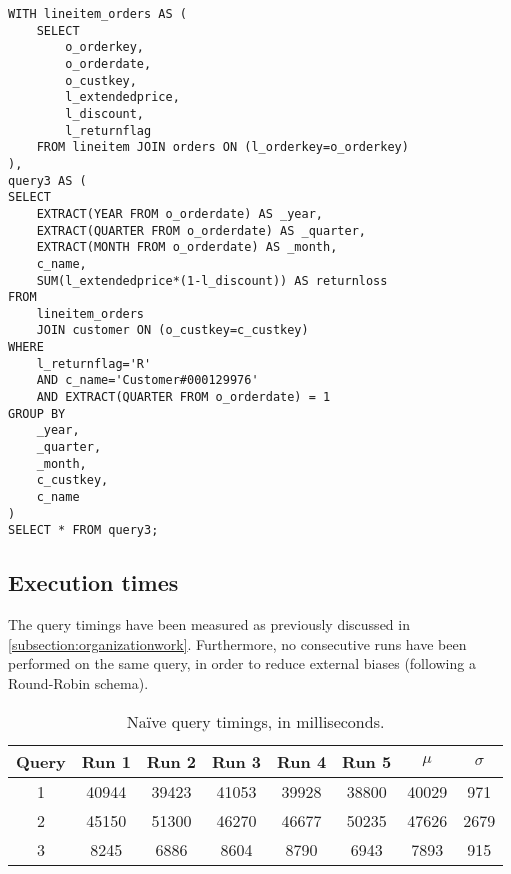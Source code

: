 \begin{lstlisting}
WITH lineitem_orders AS (
	SELECT 
		o_orderkey, 
		o_orderdate, 
		o_custkey, 
		l_extendedprice, 
		l_discount, 
		l_returnflag
	FROM lineitem JOIN orders ON (l_orderkey=o_orderkey)
),
query3 AS (
SELECT
	EXTRACT(YEAR FROM o_orderdate) AS _year,
	EXTRACT(QUARTER FROM o_orderdate) AS _quarter,
	EXTRACT(MONTH FROM o_orderdate) AS _month,
	c_name,
	SUM(l_extendedprice*(1-l_discount)) AS returnloss
FROM
	lineitem_orders
	JOIN customer ON (o_custkey=c_custkey)
WHERE 
	l_returnflag='R'
	AND c_name='Customer#000129976'
	AND EXTRACT(QUARTER FROM o_orderdate) = 1
GROUP BY
	_year,
	_quarter,
	_month,
	c_custkey,
	c_name
)
SELECT * FROM query3;
\end{lstlisting}

\subsection{Execution times}

The query timings have been measured as previously discussed in \autoref{subsection:organizationwork}.
Furthermore, no consecutive runs have been performed on the same query, in order to reduce external biases (following a Round-Robin schema).

\begin{table}[!h]
\centering
\begin{tabular}{|| c | c c c c c | c c ||} 
 \hline
 Query & Run 1 & Run 2 & Run 3 & Run 4 & Run 5 & 	$\mu$ & $\sigma$ \\ [0.5ex] 
 \hline\hline
 1 & \num{40944} & \num{39423} & \num{41053} & \num{39928} & \num{38800} & \num{40029} & \num{971} \\ 
 \hline
 2 & \num{45150} & \num{51300} & \num{46270} & \num{46677} & \num{50235} & \num{47626} & \num{2679} \\ 
 \hline
 3 & \num{8245} & \num{6886} & \num{8604} & \num{8790} & \num{6943} & \num{7893} & \num{915} \\ 
 \hline
\end{tabular}
  \caption{Na\"{i}ve query timings, in milliseconds.}
  \label{tab:vanillatimings}
\end{table}